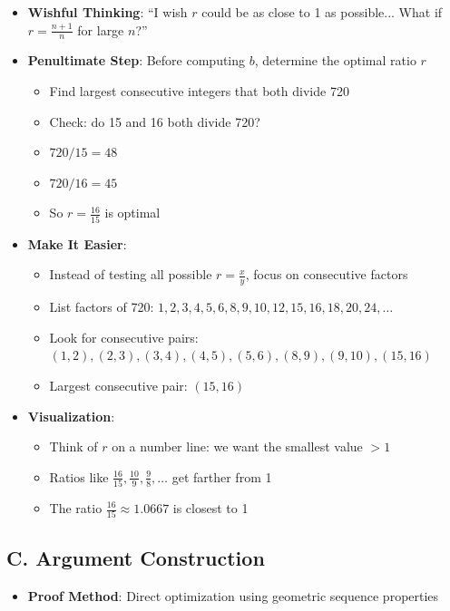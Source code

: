 \documentclass[11pt]{article}
\begin{document}
\begin{strategicbox}
\begin{itemize}[leftmargin=*]
    \item \textbf{Wishful Thinking}: ``I wish $r$ could be as close to 1 as possible... What if $r = \frac{n+1}{n}$ for large $n$?''
    
    \item \textbf{Penultimate Step}: Before computing $b$, determine the optimal ratio $r$
    \begin{itemize}
        \item Find largest consecutive integers that both divide 720
        \item Check: do 15 and 16 both divide 720?
        \item $720 / 15 = 48$ \checkmark
        \item $720 / 16 = 45$ \checkmark
        \item So $r = \frac{16}{15}$ is optimal
    \end{itemize}
    
    \item \textbf{Make It Easier}: 
    \begin{itemize}
        \item Instead of testing all possible $r = \frac{x}{y}$, focus on consecutive factors
        \item List factors of 720: $1, 2, 3, 4, 5, 6, 8, 9, 10, 12, 15, 16, 18, 20, 24, \ldots$
        \item Look for consecutive pairs: $(1,2), (2,3), (3,4), (4,5), (5,6), (8,9), (9,10), (15,16)$
        \item Largest consecutive pair: $(15, 16)$
    \end{itemize}
    
    \item \textbf{Visualization}: 
    \begin{itemize}
        \item Think of $r$ on a number line: we want the smallest value $> 1$
        \item Ratios like $\frac{16}{15}, \frac{10}{9}, \frac{9}{8}, \ldots$ get farther from 1
        \item The ratio $\frac{16}{15} \approx 1.0667$ is closest to 1
    \end{itemize}
\end{itemize}

\subsection*{C. Argument Construction}
\begin{itemize}[leftmargin=*]
    \item \textbf{Proof Method}: Direct optimization using geometric sequence properties
    

\end{itemize}
\end{strategicbox}
\end{document}
